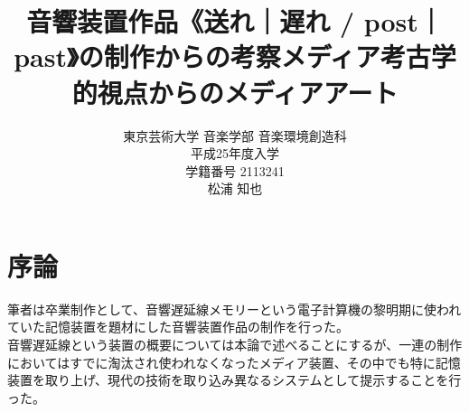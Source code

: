 \documentclass[a4paper,report]{jsbook}
\title{\Large 音響装置作品《送れ｜遅れ / post｜past》の制作からの考察\newline{\ddash}メディア考古学的視点からのメディアアート{\ddash}}
\author{東京芸術大学 音楽学部 音楽環境創造科\\平成25年度入学\\学籍番号 2113241\\松浦 知也}
\date{}
\begin{document}
\maketitle

\tableofcontents

\makeatletter
\long{}
\makeatother

\makeatletter
\let\@oldmakecaption=\@makecaption
\let\oldthefigure=\thefigure
\let\oldtheHfigure=\theHfigure
\makeatother

\makeatletter
{}
\newenvironment{no-prefix-figure-caption}{
  \let\@makecaption=\@makenoprefixcaption
  \renewcommand\thefigure{x.\thefigno}
  \renewcommand\theHfigure{x.\thefigno}
  \stepcounter{figno}
}{
  \let\thefigure=\oldthefigure
  \let\theHfigure=\oldtheHfigure
  \let\@makecaption=\@oldmakecaption
  \addtocounter{figure}{-1}
}
\makeatother

\renewcommand{\figurename}{図}

\newcommand{\plusnamesingular}{}
\newcommand{\starnamesingular}{}
\newcommand{\xrefname}[1]{\protect\renewcommand{\plusnamesingular}{#1}}
\newcommand{\Xrefname}[1]{\protect\renewcommand{\starnamesingular}{#1}}
\providecommand{\cref}{\plusnamesingular~\ref}
\providecommand{\Cref}{\starnamesingular~\ref}
\providecommand{\crefformat}[2]{}
\providecommand{\Crefformat}[2]{}

\crefformat{figure}{図~#2#1#3}
\Crefformat{figure}{図~#2#1#3}

\chapter{序論}\label{ux5e8fux8ad6}

筆者は卒業制作として、音響遅延線メモリーという電子計算機の黎明期に使われていた記憶装置を題材にした音響装置作品の制作を行った。\\
音響遅延線という装置の概要については本論で述べることにするが、一連の制作においてはすでに淘汰され使われなくなったメディア装置、その中でも特に記憶装置を取り上げ、現代の技術を取り込み異なるシステムとして提示することを行った。
\end{document}
